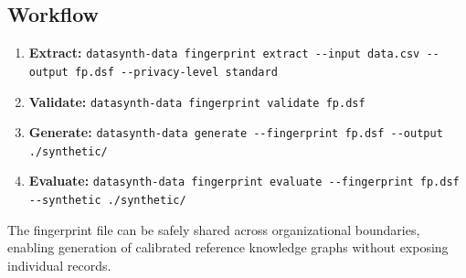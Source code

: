 \subsection{Workflow}
\label{sec:priv_workflow}

\begin{enumerate}
  \item \textbf{Extract:}
    \texttt{datasynth-data fingerprint extract -{}-input data.csv -{}-output fp.dsf -{}-privacy-level standard}
  \item \textbf{Validate:}
    \texttt{datasynth-data fingerprint validate fp.dsf}
  \item \textbf{Generate:}
    \texttt{datasynth-data generate -{}-fingerprint fp.dsf -{}-output ./synthetic/}
  \item \textbf{Evaluate:}
    \texttt{datasynth-data fingerprint evaluate -{}-fingerprint fp.dsf -{}-synthetic ./synthetic/}
\end{enumerate}

The fingerprint file can be safely shared across organizational
boundaries, enabling generation of calibrated reference knowledge
graphs without exposing individual records.
